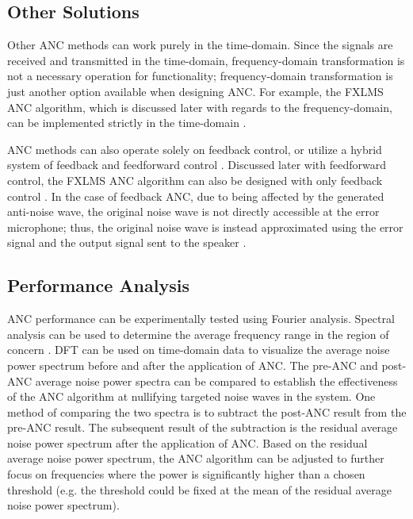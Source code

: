 \documentclass[11pt]{article}
\begin{document}

\subsection{Other Solutions}

Other ANC methods can work purely in the time-domain. Since the signals are received and transmitted in the time-domain, frequency-domain transformation is not a necessary operation for functionality; frequency-domain transformation is just another option available when designing ANC. For example, the FXLMS ANC algorithm, which is discussed later with regards to the frequency-domain, can be implemented strictly in the time-domain \cite{kajikawa}.

ANC methods can also operate solely on feedback control, or utilize a hybrid system of feedback and feedforward control \cite{gaur}. Discussed later with feedforward control, the FXLMS ANC algorithm can also be designed with only feedback control \cite{roy}. In the case of feedback ANC, due to being affected by the generated anti-noise wave, the original noise wave is not directly accessible at the error microphone; thus, the original noise wave is instead approximated using the error signal and the output signal sent to the speaker \cite{roy}.

\subsection{Performance Analysis}

ANC performance can be experimentally tested using Fourier analysis. Spectral analysis can be used to determine the average frequency range in the region of concern \cite{chen}. DFT can be used on time-domain data to visualize the average noise power spectrum before and after the application of ANC. The pre-ANC and post-ANC average noise power spectra can be compared to establish the effectiveness of the ANC algorithm at nullifying targeted noise waves in the system. One method of comparing the two spectra is to subtract the post-ANC result from the pre-ANC result. The subsequent result of the subtraction is the residual average noise power spectrum after the application of ANC. Based on the residual average noise power spectrum, the ANC algorithm can be adjusted to further focus on frequencies where the power is significantly higher than a chosen threshold (e.g. the threshold could be fixed at the mean of the residual average noise power spectrum).
\end{document}
